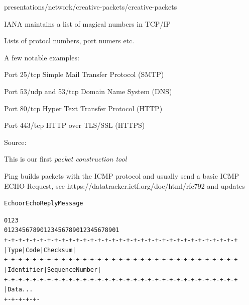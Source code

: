 \documentclass[Screen16to9,17pt]{foils}
\begin{document}
presentations/network/creative-packets/creative-packets

\begin{list1}
\item IANA maintains a list of magical numbers in TCP/IP
\item Lists of protocl numbers, port numers etc.
\item A few notable examples:
\begin{list2}
\item Port 25/tcp Simple Mail Transfer Protocol (SMTP)
\item Port 53/udp and 53/tcp Domain Name System (DNS)
\item Port 80/tcp Hyper Text Transfer Protocol (HTTP)
\item Port 443/tcp HTTP over TLS/SSL (HTTPS)
\end{list2}
\item Source: 
\end{list1}




This is our first \emph{packet construction tool}


Ping builds packets with the ICMP protocol and usually send a basic ICMP ECHO Request, see {https://datatracker.ietf.org/doc/html/rfc792} and updates
\begin{alltt}
Echo or Echo Reply Message

    0                   1                   2                   3
    0 1 2 3 4 5 6 7 8 9 0 1 2 3 4 5 6 7 8 9 0 1 2 3 4 5 6 7 8 9 0 1
   +-+-+-+-+-+-+-+-+-+-+-+-+-+-+-+-+-+-+-+-+-+-+-+-+-+-+-+-+-+-+-+-+
   |     Type      |     Code      |          Checksum             |
   +-+-+-+-+-+-+-+-+-+-+-+-+-+-+-+-+-+-+-+-+-+-+-+-+-+-+-+-+-+-+-+-+
   |           Identifier          |        Sequence Number        |
   +-+-+-+-+-+-+-+-+-+-+-+-+-+-+-+-+-+-+-+-+-+-+-+-+-+-+-+-+-+-+-+-+
   |     Data ...
   +-+-+-+-+-
\end{alltt}
\end{document}
